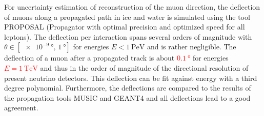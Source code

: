 For uncertainty estimation of reconstruction of the muon direction, the 
deflection of muons along a propagated path in ice and water is simulated using 
the tool PROPOSAL (Propagator with optimal precision and optimized speed for all leptons). 
The deflection per interaction spans several 
orders of magnitude with $\theta \in [\SI[print-unity-mantissa = false]{e-9}{\degree},\, \SI{1}{\degree}]$ for energies $E < \SI{1}{\peta\electronvolt}$ 
and is rather negligible. The 
deflection of a muon after a propagated track is about \textcolor{red}{$\SI{0.1}{\degree}$} for 
energies \textcolor{red}{$E = \SI{1}{\tera\electronvolt}$} and thus in the order of magnitude of 
the directional resolution of 
present neutrino detectors. This deflection can be fit against energy with a 
third degree polynomial. Furthermore, the deflections are compared to the results 
of the propagation tools MUSIC and GEANT4 and all deflections lead to 
a good agreement.




